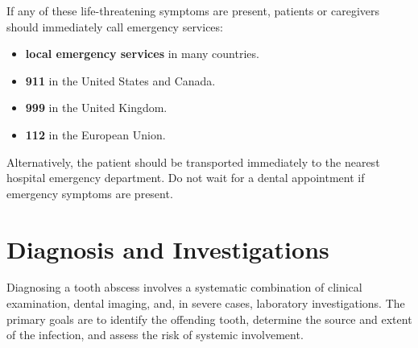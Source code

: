 If any of these life-threatening symptoms are present, patients or caregivers should immediately call emergency services:
\begin{itemize}
  \item \textbf{local emergency services} in many countries.
  \item \textbf{911} in the United States and Canada.
  \item \textbf{999} in the United Kingdom.
  \item \textbf{112} in the European Union.
\end{itemize}
Alternatively, the patient should be transported immediately to the nearest hospital emergency department. Do not wait for a dental appointment if emergency symptoms are present.

\section*{Diagnosis and Investigations}
Diagnosing a tooth abscess involves a systematic combination of clinical examination, dental imaging, and, in severe cases, laboratory investigations. The primary goals are to identify the offending tooth, determine the source and extent of the infection, and assess the risk of systemic involvement.

